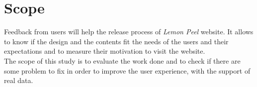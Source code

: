 \documentclass[../../UsabilityReport.tex]{subfiles}
\begin{document}
\section{Scope}
	Feedback from users will help the release process of \textit{Lemon Peel} website. It allows to know if the design and the contents fit the needs of the users and their expectations and to measure their motivation to visit the website.\\
	The scope of this study is to evaluate the work done and to check if there are some problem to fix in order to improve the user experience, with the support of real data.
\end{document}
